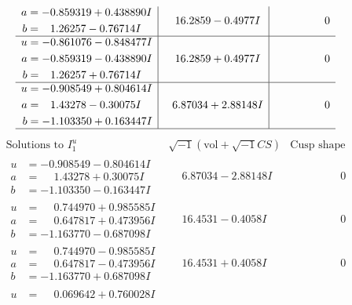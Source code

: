 \documentclass[1p]{elsarticle_modified}
\theoremstyle{definition}
\newcommand{\I}{\sqrt{-1}}
\begin{document}
$$\begin{array}{c|c|c}
\begin{aligned}
a &= -0.859319 + 0.438890 I \\
b &= \phantom{-}1.26257 - 0.76714 I\end{aligned}
 & \phantom{-}16.2859 - 0.4977 I & \phantom{-0.000000 } 0 \\ \hline\begin{aligned}
u &= -0.861076 - 0.848477 I \\
a &= -0.859319 - 0.438890 I \\
b &= \phantom{-}1.26257 + 0.76714 I\end{aligned}
 & \phantom{-}16.2859 + 0.4977 I & \phantom{-0.000000 } 0 \\ \hline\begin{aligned}
u &= -0.908549 + 0.804614 I \\
a &= \phantom{-}1.43278 - 0.30075 I \\
b &= -1.103350 + 0.163447 I\end{aligned}
 & \phantom{-}6.87034 + 2.88148 I & \phantom{-0.000000 } 0\\
 \hline 
 \end{array}$$\newpage$$\begin{array}{c|c|c}  
\text{Solutions to }I^u_{1}& \I (\text{vol} + \sqrt{-1}CS) & \text{Cusp shape}\\
 \hline 
\begin{aligned}
u &= -0.908549 - 0.804614 I \\
a &= \phantom{-}1.43278 + 0.30075 I \\
b &= -1.103350 - 0.163447 I\end{aligned}
 & \phantom{-}6.87034 - 2.88148 I & \phantom{-0.000000 } 0 \\ \hline\begin{aligned}
u &= \phantom{-}0.744970 + 0.985585 I \\
a &= \phantom{-}0.647817 + 0.473956 I \\
b &= -1.163770 - 0.687098 I\end{aligned}
 & \phantom{-}16.4531 - 0.4058 I & \phantom{-0.000000 } 0 \\ \hline\begin{aligned}
u &= \phantom{-}0.744970 - 0.985585 I \\
a &= \phantom{-}0.647817 - 0.473956 I \\
b &= -1.163770 + 0.687098 I\end{aligned}
 & \phantom{-}16.4531 + 0.4058 I & \phantom{-0.000000 } 0 \\ \hline\begin{aligned}
u &= \phantom{-}0.069642 + 0.760028 I \\

\end{aligned}
\end{array}$$
\end{document}
